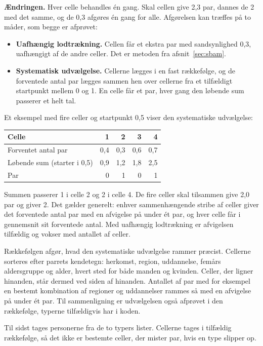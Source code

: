 \documentclass[11pt,a4paper]{article}
\begin{document}
\textbf{Ændringen.} Hver celle behandles én gang. Skal cellen give 2,3 par, dannes de 2 med det
samme, og de 0,3 afgøres én gang for alle. Afgørelsen kan træffes på to måder, som begge er afprøvet:

\begin{itemize}
\item \textbf{Uafhængig lodtrækning.} Cellen får et ekstra par med sandsynlighed 0,3, uafhængigt af
de andre celler. Det er metoden fra afsnit~\ref{sec:sbam}.
\item \textbf{Systematisk udvælgelse.} Cellerne lægges i en fast rækkefølge, og de forventede antal
par lægges sammen hen over cellerne fra et tilfældigt startpunkt mellem 0 og 1. En celle får et par,
hver gang den løbende sum passerer et helt tal.
\end{itemize}

Et eksempel med fire celler og startpunkt 0,5 viser den systematiske udvælgelse:

\begin{center}
\begin{tabular}{@{}lrrrr@{}}
\toprule
Celle & 1 & 2 & 3 & 4 \\
\midrule
Forventet antal par & 0,4 & 0,3 & 0,6 & 0,7 \\
Løbende sum (starter i 0,5) & 0,9 & 1,2 & 1,8 & 2,5 \\
Par & 0 & 1 & 0 & 1 \\
\bottomrule
\end{tabular}
\end{center}

Summen passerer 1 i celle 2 og 2 i celle 4. De fire celler skal tilsammen give 2,0 par og giver 2.
Det gælder generelt: enhver sammenhængende stribe af celler giver det forventede antal par med en
afvigelse på under ét par, og hver celle får i gennemsnit sit forventede antal. Med uafhængig
lodtrækning er afvigelsen tilfældig og vokser med antallet af celler.

Rækkefølgen afgør, hvad den systematiske udvælgelse rammer præcist. Cellerne sorteres efter parrets
kendetegn: herkomst, region, uddannelse, femårs aldersgruppe og alder, hvert sted for både manden og
kvinden. Celler, der ligner hinanden, står dermed ved siden af hinanden. Antallet af par med for
eksempel en bestemt kombination af regioner og uddannelser rammes så med en afvigelse på under ét
par. Til sammenligning er udvælgelsen også afprøvet i den rækkefølge, typerne tilfældigvis har i
koden.

Til sidst tages personerne fra de to typers lister. Cellerne tages i tilfældig rækkefølge, så det
ikke er bestemte celler, der mister par, hvis en type slipper op.
\end{document}
